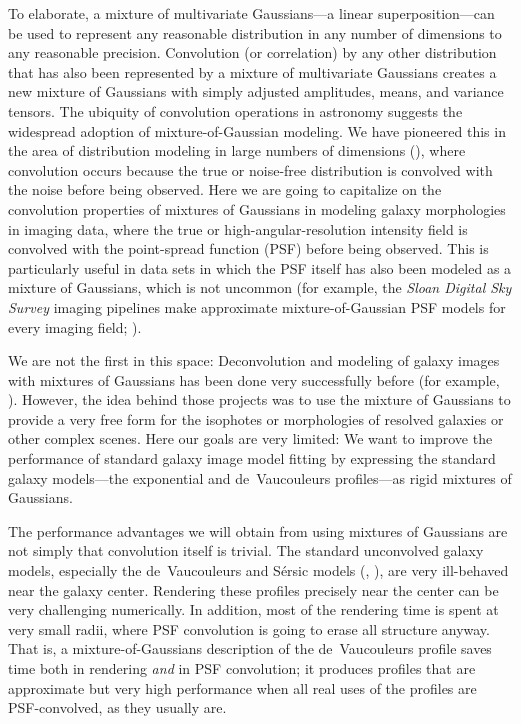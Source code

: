 \documentclass[12pt,pdftex,preprint]{aastex}
\newcommand{\project}[1]{\textsl{#1}}
\begin{document}
To elaborate, a mixture of multivariate Gaussians---a linear
superposition---can be used to represent any reasonable distribution
in any number of dimensions to any reasonable precision.  Convolution
(or correlation) by any other distribution that has also been
represented by a mixture of multivariate Gaussians creates a new
mixture of Gaussians with simply adjusted amplitudes, means, and
variance tensors.  The ubiquity of convolution operations in astronomy
suggests the widespread adoption of mixture-of-Gaussian modeling.  We
have pioneered this in the area of distribution modeling in large
numbers of dimensions (\citealt{xd, xdqso, xdqsoz}), where convolution
occurs because the true or noise-free distribution is convolved with
the noise before being observed.  Here we are going to capitalize on
the convolution properties of mixtures of Gaussians in modeling galaxy
morphologies in imaging data, where the true or
high-angular-resolution intensity field is convolved with the
point-spread function (PSF) before being observed.  This is
particularly useful in data sets in which the PSF itself has also been
modeled as a mixture of Gaussians, which is not uncommon (for example,
the \project{Sloan Digital Sky Survey} imaging pipelines
make approximate mixture-of-Gaussian PSF models for
every imaging field; \citealt{lupton}).

We are not the first in this space:  Deconvolution and modeling of
galaxy images with mixtures of Gaussians has been done very
successfully before (for example, \citealt{bendinelli, emsellem,
  bendinelli2, cappellari}).  However, the idea behind those projects
was to use the mixture of Gaussians to provide a very free form for
the isophotes or morphologies of resolved galaxies or other complex
scenes.  Here our goals are very limited: We want to improve the
performance of standard galaxy image model fitting by expressing the
standard galaxy models---the exponential and de~Vaucouleurs
profiles---as rigid mixtures of Gaussians.

The performance advantages we will obtain from using mixtures of
Gaussians are not simply that convolution itself is trivial.  The
standard unconvolved galaxy models, especially the de~Vaucouleurs and
S\'ersic models (\citealt{dev}, \citealt{ser}), are very ill-behaved
near the galaxy center.  Rendering these profiles precisely near the
center can be very challenging numerically.  In addition, most of the
rendering time is spent at very small radii, where PSF convolution is
going to erase all structure anyway.  That is, a mixture-of-Gaussians
description of the de~Vaucouleurs profile saves time both in rendering
\emph{and} in PSF convolution; it produces profiles that are
approximate but very high performance when all real uses of the
profiles are PSF-convolved, as they usually are.
\end{document}
